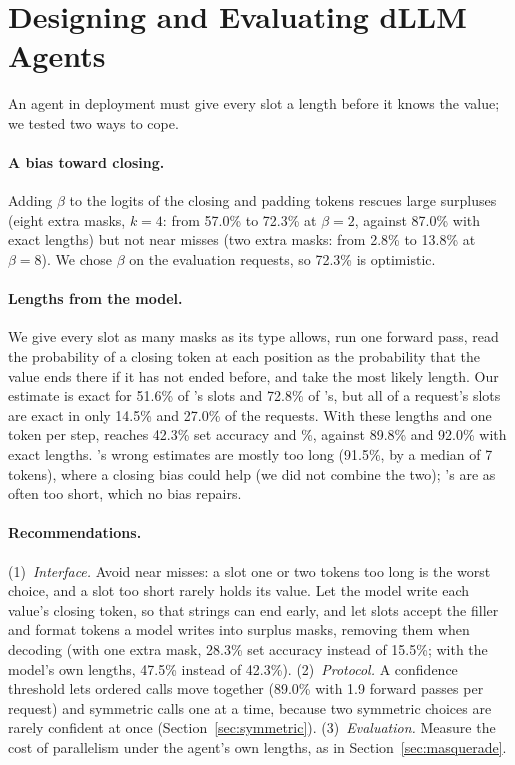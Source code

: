 \section{Designing and Evaluating dLLM Agents}
\label{sec:design}

An agent in deployment must give every slot a length before it knows the value; we tested two ways to cope.

\paragraph{A bias toward closing.} Adding $\beta$ to the logits of the closing and padding tokens rescues large surpluses (eight extra masks, $k=4$: from 57.0\% to 72.3\% at $\beta=2$, against 87.0\% with exact lengths) but not near misses (two extra masks: from 2.8\% to 13.8\% at $\beta=8$). We chose $\beta$ on the evaluation requests, so 72.3\% is optimistic.

\paragraph{Lengths from the model.} We give every slot as many masks as its type allows, run one forward pass, read the probability of a closing token at each position as the probability that the value ends there if it has not ended before, and take the most likely length. Our estimate is exact for 51.6\% of \dream's slots and 72.8\% of \llada's, but all of a request's slots are exact in only 14.5\% and 27.0\% of the requests. With these lengths and one token per step, \dream reaches 42.3\% set accuracy and \%, against 89.8\% and 92.0\% with exact lengths. \dream's wrong estimates are mostly too long (91.5\%, by a median of 7 tokens), where a closing bias could help (we did not combine the two); \llada's are as often too short, which no bias repairs.

\paragraph{Recommendations.} (1)~\emph{Interface.} Avoid near misses: a slot one or two tokens too long is the worst choice, and a slot too short rarely holds its value. Let the model write each value's closing token, so that strings can end early, and let slots accept the filler and format tokens a model writes into surplus masks, removing them when decoding (with one extra mask, 28.3\% set accuracy instead of 15.5\%; with the model's own lengths, 47.5\% instead of 42.3\%).
(2)~\emph{Protocol.} A confidence threshold lets ordered calls move together (89.0\% with 1.9 forward passes per request) and symmetric calls one at a time, because two symmetric choices are rarely confident at once (Section~\ref{sec:symmetric}).
(3)~\emph{Evaluation.} Measure the cost of parallelism under the agent's own lengths, as in Section~\ref{sec:masquerade}.
